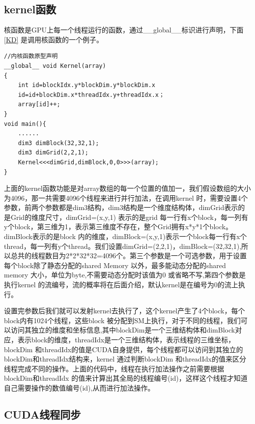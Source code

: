 \subsection{kernel函数}
核函数是GPU上每一个线程运行的函数，通过\_\_global\_\_标识进行声明，下面 \ref{KD} 是调用核函数的一个例子。
\begin{lstlisting}[caption={kernel调用代码示例},captionpos=b,firstnumber=1,label={KD}]
//内核函数原型声明
__global__ void Kernel(array)
{
    int id=blockIdx.y*blockDim.y*blockDim.x
    id=id+blockDim.x*threadIdx.y+threadIdx.x；
    array[id]++;
}
void main(){
    ......
    dim3 dimBlock(32,32,1);
    dim3 dimGrid(2,2,1);
    Kernel<<<dimGrid,dimBlock,0,0>>>(array);
}
\end{lstlisting}
上面的kernel函数功能是对array数组的每一个位置的值加一，我们假设数组的大小为4096，那一共需要4096个线程来进行并行加法，在调用kernel 时，需要设置4个参数，前两个参数都是dim3结构，dim3结构是一个维度结构体，dimGrid表示的是Grid的维度尺寸，dimGrid=(x,y,1) 表示的是grid 每一行有x个block，每一列有y个block，第三维为1，表示第三维度不存在，整个Grid拥有x*y*1个block。dimBlock表示的是block 内的维度，dimBlock=(x,y,1)表示一个block每一行有x个thread，每一列有y个thread。我们设置dimGrid=(2,2,1)，dimBlock=(32,32,1),所以总共的线程数目为2*2*32*32=4096个。第三个参数是一个可选参数，用于设置每个block除了静态分配的shared Memory 以外，最多能动态分配的shared memory 大小，单位为byte,不需要动态分配时该值为0 或省略不写,第四个参数是执行kernel 的流编号，流的概率将在后面介绍，默认kernel是在编号为0的流上执行。

设置完参数后我们就可以发射kernel去执行了，这个kernel产生了4个block，每个block内有1024个线程，这些block 被分配到SM上执行，对于不同的线程，我们可以访问其独立的维度和坐标信息,其中blockDim是一个三维结构体和dimBlock对应，表示block的维度，threadIdx是一个三维结构体，表示线程的三维坐标，blockDim 和threadIdx的值是CUDA自身提供，每个线程都可以访问到其独立的blockDim和threadIdx结构来，kernel 通过判断blockDim 和threadIdx的值来区分线程完成不同的操作。上面的代码中，线程在执行加法操作之前需要根据blockDim和threadIdx 的值来计算出其全局的线程编号(id)，这样这个线程才知道自己需要操作的数值编号(id),从而进行加法操作。

\subsection{CUDA线程同步}

